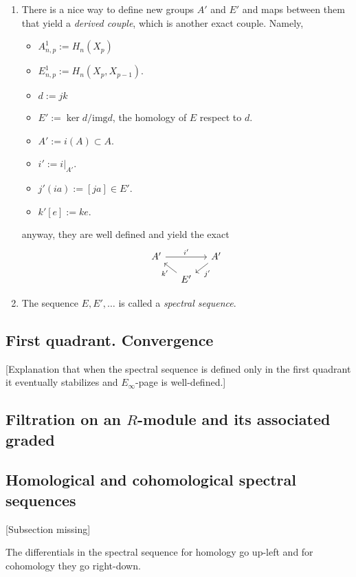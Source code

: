 \begin{definition}
\begin{enumerate}
	\item There is a nice way to define new groups $A'$ and $E'$ and maps between them that yield a {\it derived couple}, which is another exact couple.	Namely,
		\begin{itemize}
			\item $A^1_{n,p}:=H_n(X_p)$
			\item $E^1_{n,p}:=H_n(X_p,X_{p-1})$.
			\item $d:=jk$
			\item $E':=\ker d/\text{img}d$, the homology of $E$ respect to $d$.
			\item $A':=i(A)\subset A$.
			\item $i':=i|_{A'}$.
			\item $j'(ia):=[ja]\in E'$.
			\item $k'[e]:=ke$.
		\end{itemize}
	anyway, they are well defined and yield the exact
	$$\begin{tikzcd}[column sep=small,row sep=small]
		A'\arrow[rr,"i'"]&&A'\arrow[dl,"j'"]\\
		&E'\arrow[ul,"k'"]
	\end{tikzcd}$$

	\item The sequence $E,E',\ldots$ is called a {\it spectral sequence}.
\end{enumerate}

\subsection{First quadrant. Convergence}

[Explanation that when the spectral sequence is defined only in the first quadrant it eventually stabilizes and $E_{\infty}$-page is well-defined.]

\subsection{Filtration on an \texorpdfstring{$R$}{R}-module and its associated graded}

\subsection{Homological and cohomological spectral sequences}

[Subsection missing]

\begin{remark}
	The differentials in the spectral sequence for homology go up-left and for cohomology they go right-down.
\end{remark}


\end{definition}
